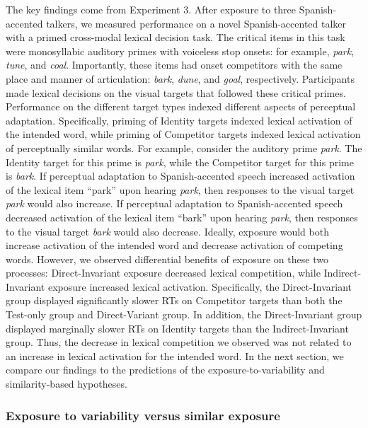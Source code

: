 \documentclass[
  12pt,
  twoside]{article}
\begin{document}
The key findings come from Experiment 3.
After exposure to three Spanish-accented talkers, we measured performance on a novel Spanish-accented talker with a primed cross-modal lexical decision task.
The critical items in this task were monosyllabic auditory primes with voiceless stop onsets: for example, \emph{park}, \emph{tune}, and \emph{coal}.
Importantly, these items had onset competitors with the same place and manner of articulation: \emph{bark}, \emph{dune}, and \emph{goal}, respectively.
Participants made lexical decisions on the visual targets that followed these critical primes.
Performance on the different target types indexed different aspects of perceptual adaptation.
Specifically, priming of Identity targets indexed lexical activation of the intended word, while priming of Competitor targets indexed lexical activation of perceptually similar words.
For example, consider the auditory prime \emph{park}.
The Identity target for this prime is \emph{park}, while the Competitor target for this prime is \emph{bark}.
If perceptual adaptation to Spanish-accented speech increased activation of the lexical item ``park'' upon hearing \emph{park}, then responses to the visual target \emph{park} would also increase.
If perceptual adaptation to Spanish-accented speech decreased activation of the lexical item ``bark'' upon hearing \emph{park}, then responses to the visual target \emph{bark} would also decrease.
Ideally, exposure would both increase activation of the intended word and decrease activation of competing words.
However, we observed differential benefits of exposure on these two processes: Direct-Invariant exposure decreased lexical competition, while Indirect-Invariant exposure increased lexical activation.
Specifically, the Direct-Invariant group displayed significantly slower RTs on Competitor targets than both the Test-only group and Direct-Variant group.
In addition, the Direct-Invariant group displayed marginally slower RTs on Identity targets than the Indirect-Invariant group.
Thus, the decrease in lexical competition we observed was not related to an increase in lexical activation for the intended word.
In the next section, we compare our findings to the predictions of the exposure-to-variability and similarity-based hypotheses.

\hypertarget{exposure-to-variability-versus-similar-exposure}{%
\subsubsection{Exposure to variability versus similar exposure}\label{exposure-to-variability-versus-similar-exposure}}
\end{document}
